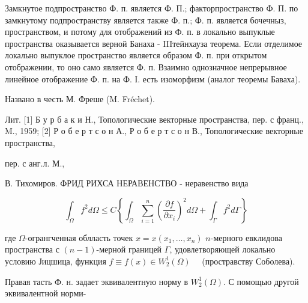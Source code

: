 \documentclass[10pt]{article}
\begin{document}
Замкнутое подпространство Ф. п. является Ф. П.; факторпространство Ф. П. по замкнутому подпространству является также Ф. п.; Ф. п. является бочечныз, пространством, и потому для отображений из Ф. п. в локально выпуклые пространства оказывается верной Банаха - IIIтейнхауза теорема. Если отделимое локально выпуклое пространство является образом Ф. п. при открытом отображении, то оно само является Ф. п. Взаимно однозначное непрерывное линейное отображение Ф. п. на Ф. І. есть изоморфизм (аналог теоремы Баваха).



Названо в честь М. Фреше (M. Fréchet).



Лит. [1] Б у р б а к и Н., Топологические векторные пространства, пер. с франц., M., 1959; [2] Р о б е р т с о н А., Р о б е р т с о н В., Топологические векторные пространства,

пер. с анг.л. М.,

В. Тихомиров. ФРИД РИХСА НЕРАВЕНСТВО - неравенство вида



\[

\int_{\Omega} f^{2} d \Omega \leqslant C\left\{\int_{\Omega} \sum_{i=1}^{n}\left(\frac{\partial f}{\partial x_{i}}\right)^{2} d \Omega+\int_{\Gamma} f^{2} d \Gamma\right\}

\]



где $\Omega$-огрангченная облласть точек $x=x\left(x_{1}, \ldots, x_{n}\right)$ $n$-мерного евклидова пространства с $(n-1)$-мерной границей $\Gamma$, удовлетворяющей локально условию Јицшица, функция $f \equiv f(x) \in W_{2}^{1}(\Omega) \quad$ (простравству Соболева).



Правая тасть Ф. н. задает эквивалентную норму в $W_{2}^{1}(\Omega)$. С помощью другой эквивалентной норми-
\end{document}
